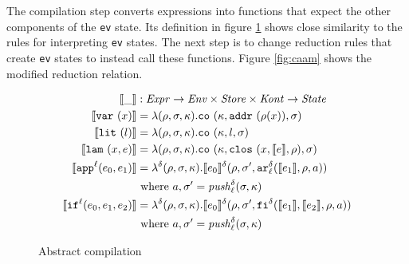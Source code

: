 \documentclass[preprint,onecolumn,9pt]{sigplanconf} %
\begin{document}
The compilation step converts expressions into functions that expect
the other components of the {\tt ev} state. Its definition in figure
\ref{fig:compile} shows close similarity to the rules for interpreting
    {\tt ev} states. The next step is to change reduction rules that
    create {\tt ev} states to instead call these functions. Figure
    \ref{fig:caam} shows the modified reduction relation.

\begin{figure}
\begin{align*}
\compile{\_} &: \Expr \to \Env \times \Store \times \Kont \to \State \\
\compile{\svar\mvar} &= \lambda(\menv,\msto,\mkont) .\co{\mkont,\saddr{\menv(\mvar)},\msto}
\\
\compile{\slit\mlit} &= \lambda(\menv,\msto,\mkont) .
\co{\mkont,\mlit,\msto}
\\
\compile{\slam\mvar\mexp} &= \lambda(\menv,\msto,\mkont) .
\co{\mkont,\clos{\mvar,\compile\mexp,\menv},\msto}
\\
\compile{\sapp[^\mlab]{\mexpi0}{\mexpi1}} &= \lambda^\mcntr(\menv,\msto,\mkont) .
\compile{\mexpi0}^\mcntr(\menv,\msto',\kar[_\mlab^\mcntr]{\compile{\mexpi1},\menv,\maddr})
\\
&
\text{ where }\maddr,\msto' = \mathit{push}^\mcntr_\mlab(\msto,\mkont)
\\
\compile{\sif[^\mlab]{\mexpi0}{\mexpi1}{\mexpi2}} &= \lambda^\mcntr(\menv,\msto,\mkont) .
\compile{\mexpi0}^\delta(\menv,\msto',\kif[^\mcntr]{\compile{\mexpi1},\compile{\mexpi2},\menv,\maddr})
\\
&\text{ where }\maddr,\msto' = \mathit{push}_\mlab^\mcntr(\msto,\mkont)
\end{align*}
\caption{Abstract compilation}
\label{fig:compile}
\end{figure}
\end{document}
